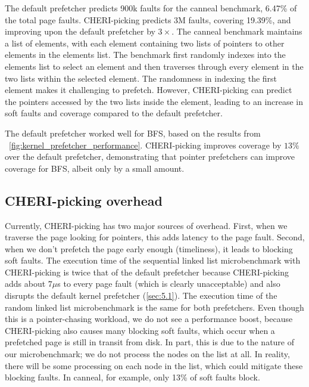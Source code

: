 The default prefetcher predicts 900k faults for the canneal benchmark, 6.47\% of the total page faults.
CHERI-picking predicts 3M faults, covering 19.39\%, and improving upon the default prefetcher by $3\times$. The canneal benchmark maintains a list of elements, with each element containing two lists of pointers to other elements in the elements list. 
The benchmark first randomly indexes into the elements list to select an element and then traverses through every element in the two lists within the selected element.
The randomness in indexing the first element makes it challenging to prefetch. 
However, CHERI-picking can predict the pointers accessed by the two lists inside the element, leading to an increase in soft faults and coverage compared to the default prefetcher.

The default prefetcher worked well for BFS, based on the results from ~\autoref{fig:kernel_prefetcher_performance}. 
CHERI-picking improves coverage by $13\%$ over the default prefetcher, demonstrating that pointer prefetchers can improve coverage for BFS, albeit only by a small amount.

\subsection{CHERI-picking overhead}
\label{sec:overhead}
Currently, CHERI-picking has two major sources of overhead. First, when we traverse the page looking for pointers, this adds latency to the page fault. Second, when we don't prefetch the page early enough (timeliness), it leads to blocking soft faults. 
The execution time of the sequential linked list microbenchmark with
CHERI-picking is twice that of the default prefetcher because
CHERI-picking adds about $7\mu$s to every page fault (which is clearly unacceptable)
and also disrupts the default kernel prefetcher (\autoref{sec:5.1}).
The execution time of the random linked list microbenchmark is the same for both prefetchers.
Even though this is a pointer-chasing workload, we do not see a performance boost, because
CHERI-picking also causes many blocking soft faults, which occur when a prefetched page is still in transit from disk. In part, this is due to the nature of our microbenchmark; we do not process the nodes on the list at all. In reality, there will be some processing on each node in the list, which could mitigate these blocking faults.
In canneal, for example, only 13\% of soft faults block.

